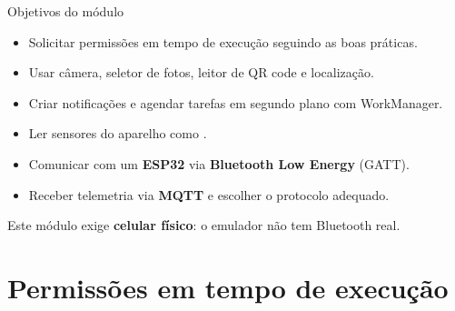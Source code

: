 \documentclass[aspectratio=169,10pt]{beamer}
\begin{document}
\capa

\begin{frame}{Objetivos do módulo}
  \begin{conceito}
    \begin{itemize}
      \item Solicitar permissões em tempo de execução seguindo as boas práticas.
      \item Usar câmera, seletor de fotos, leitor de QR code e localização.
      \item Criar notificações e agendar tarefas em segundo plano com WorkManager.
      \item Ler sensores do aparelho como .
      \item Comunicar com um \textbf{ESP32} via \textbf{Bluetooth Low Energy} (GATT).
      \item Receber telemetria via \textbf{MQTT} e escolher o protocolo adequado.
    \end{itemize}
  \end{conceito}
  \begin{atencao}
    Este módulo exige \textbf{celular físico}: o emulador não tem Bluetooth real.
  \end{atencao}
\end{frame}

\sumario

\section{Permissões em tempo de execução}
\end{document}
